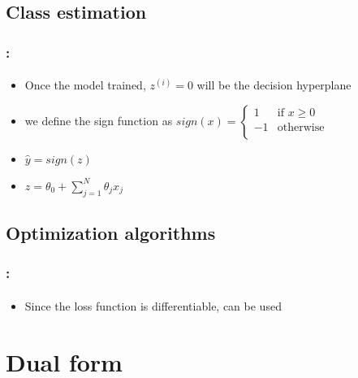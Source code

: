 \documentclass[xcolor=table]{beamer}
\begin{document}
\subsection{Class estimation}

\begin{frame}
	\frametitle{\insertshortsubtitle: \insertsection}
	\framesubtitle{\insertsubsection}
	
	\begin{itemize}
		\item Once the model trained, $ z^{(i)} = 0 $ will be the decision hyperplane
		\item we define the sign function as $ sign(x) = \begin{cases}
			1 & \text{if } x \ge 0\\
			-1 & \text{otherwise}\\
		\end{cases} $
		\item $ \hat{y} = sign(z)$
		\item $ z = \theta_0 + \sum_{j=1}^{N} \theta_j x_j $
	\end{itemize}
	
	
\end{frame}

\subsection{Optimization algorithms}

\begin{frame}
	\frametitle{\insertshortsubtitle: \insertsection}
	\framesubtitle{\insertsubsection}
	
	\begin{itemize}
		\item Since the loss function is differentiable,  can be used
	\end{itemize}
	
\end{frame}


\section{Dual form}
\end{document}

